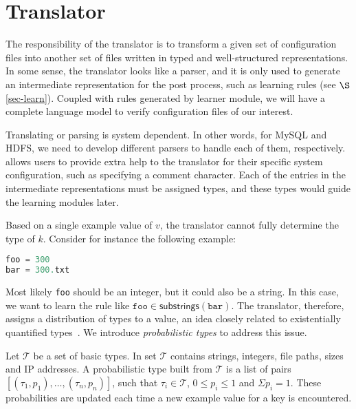 
\section{Translator}


The responsibility of the translator is to transform a given set of
configuration files into another set of files written in
typed and well-structured representations.
In some sense, the translator looks like a parser, and it is only
used to generate an intermediate representation for the post
process, such as learning rules (see $\S$\ref{sec-learn}).
Coupled with rules generated by learner module,
we will have a complete language model to verify configuration files
of our interest.

Translating or parsing is system dependent. In other words, for MySQL
and HDFS, we need to develop different parsers to handle each of them,
respectively. \app allows users to provide extra help to the translator
for their specific system configuration, such as specifying a comment 
character. Each of the entries in the intermediate representations
must be assigned types, and these types would guide the learning
modules later.


Based on a single example value of $v$,
the translator cannot fully determine the type of $k$.
Consider for instance the following example:

\begin{lstlisting}[language=C, xleftmargin=.01\textwidth]
foo = 300
bar = 300.txt
\end{lstlisting} 

Most likely {\tt foo} should be an integer, but it could also be a string.
In this case, we want to learn the rule like 
$ \texttt{foo} \in \textsf{substrings}(\texttt{bar})$. 
The translator, therefore, assigns a distribution of types 
to a value, an idea closely related to existentially quantified 
types~\cite{Launchbury93lazyfunctional}. 
We introduce {\em probabilistic types} to address this issue.

Let $\mathcal{T}$ be a set of basic types. 
In \app set $\mathcal{T}$ contains strings, integers, file paths, 
sizes and IP addresses. 
A probabilistic type built from $\mathcal{T}$ is a list of pairs 
$[(\tau_1, p_1),\ldots,(\tau_n, p_n)]$,
such that $\tau_i \in \mathcal{T}$, $0 \le p_i \le 1$ 
and $\Sigma p_i = 1$. 
These probabilities are updated each time a new example value 
for a key is encountered.

